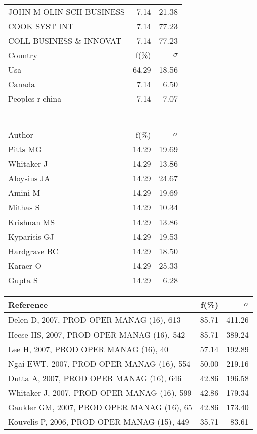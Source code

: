 \documentclass[a4paper,11pt]{report}
\begin{document}
\begin{landscape}
\begin{table}[!ht]
{\begin{tabular}{|l r r|}
JOHN M OLIN SCH BUSINESS & 7.14 & 21.38\\
COOK SYST INT & 7.14 & 77.23\\
COLL BUSINESS \& INNOVAT & 7.14 & 77.23\\
\hline
\hline
Country & f(\%) & $\sigma$\\
\hline
Usa & 64.29 & 18.56\\
Canada & 7.14 & 6.50\\
Peoples r china & 7.14 & 7.07\\
 &  & \\
 &  & \\
 &  & \\
 &  & \\
 &  & \\
 &  & \\
 &  & \\
\hline
\hline
Author & f(\%) & $\sigma$\\
\hline
Pitts MG & 14.29 & 19.69\\
Whitaker J & 14.29 & 13.86\\
Aloysius JA & 14.29 & 24.67\\
Amini M & 14.29 & 19.69\\
Mithas S & 14.29 & 10.34\\
Krishnan MS & 14.29 & 13.86\\
Kyparisis GJ & 14.29 & 19.53\\
Hardgrave BC & 14.29 & 18.50\\
Karaer O & 14.29 & 25.33\\
Gupta S & 14.29 & 6.28\\
\hline
\end{tabular}
}
{\scriptsize\begin{tabular}{|l r r|}
\hline
Reference & f(\%) & $\sigma$\\
\hline
Delen D, 2007, PROD OPER MANAG (16), 613 & 85.71 & 411.26\\
Heese HS, 2007, PROD OPER MANAG (16), 542 & 85.71 & 389.24\\
Lee H, 2007, PROD OPER MANAG (16), 40 & 57.14 & 192.89\\
Ngai EWT, 2007, PROD OPER MANAG (16), 554 & 50.00 & 219.16\\
Dutta A, 2007, PROD OPER MANAG (16), 646 & 42.86 & 196.58\\
Whitaker J, 2007, PROD OPER MANAG (16), 599 & 42.86 & 179.34\\
Gaukler GM, 2007, PROD OPER MANAG (16), 65 & 42.86 & 173.40\\
Kouvelis P, 2006, PROD OPER MANAG (15), 449 & 35.71 & 83.61\\

\end{tabular}}
\end{table}
\end{landscape}
\end{document}
